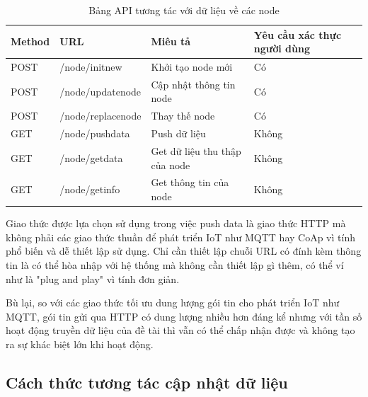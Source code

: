 \begin{table}[H]
	\centering
	\caption{Bảng API tương tác với dữ liệu về các node}
	\begin{tabular}{|l|l|l|l|}
		\hline
		Method & URL            & Miêu tả         & Yêu cầu xác thực người dùng        \\ \hline
		POST   & /node/initnew       & Khởi tạo node mới                & Có           \\ \hline
		POST   & /node/updatenode     & Cập nhật thông tin node & Có \\ \hline
		POST   & /node/replacenode       & Thay thế node  & Có       \\ \hline
		GET   & /node/pushdata & Push dữ liệu               &         Không                \\ \hline
		GET   & /node/getdata    & Get dữ liệu thu thập của node         &  Không      \\ \hline
		GET   & /node/getinfo   & Get thông tin của node & Không  \\ \hline
	\end{tabular}
	\label{table: apilist}
\end{table}

Giao thức được lựa chọn sử dụng trong việc push data là giao thức HTTP mà không phải các giao thức thuần để phát triển IoT như MQTT hay CoAp vì tính phổ biến và dễ thiết lập sử dụng. Chỉ cần thiết lập chuỗi URL có đính kèm thông tin là có thể hòa nhập với hệ thống mà không cần thiết lập gì thêm, có thể ví như là "plug and play" vì tính đơn giản. 

Bù lại, so với các giao thức tối ưu dung lượng gói tin cho phát triển IoT như MQTT, gói tin gửi qua HTTP có dung lượng nhiều hơn đáng kể nhưng với tần số hoạt động truyền dữ liệu của đề tài thì vẫn có thể chấp nhận được và không tạo ra sự khác biệt lớn khi hoạt động.
\subsection{Cách thức tương tác cập nhật dữ liệu}

